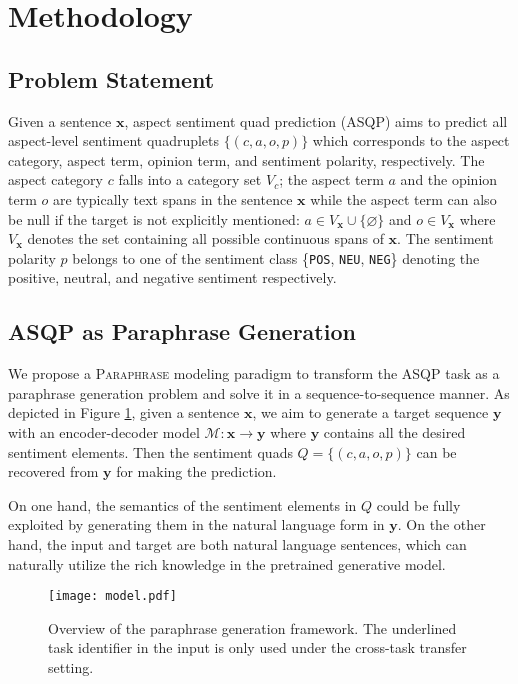 \documentclass[11pt]{article}
\begin{document}
\section{Methodology}

\subsection{Problem Statement}
Given a sentence $\boldsymbol{x}$, aspect sentiment quad prediction (ASQP) aims to predict all aspect-level sentiment quadruplets $\{(c, a, o, p)\}$ which corresponds to the aspect category, aspect term, opinion term, and sentiment polarity, respectively. The aspect category $c$ falls into a category set $V_c$; the aspect term $a$ and the opinion term $o$ are typically text spans in the sentence $\boldsymbol{x}$ while the aspect term can also be null if the target is not explicitly mentioned: $a \in V_{\boldsymbol{x}} \cup \{\varnothing\}$ and $o \in V_{\boldsymbol{x}}$ where $V_{\boldsymbol{x}}$ denotes the set containing all possible continuous spans of $\boldsymbol{x}$. The sentiment polarity $p$ belongs to one of the sentiment class \{\texttt{POS}, \texttt{NEU}, \texttt{NEG}\} denoting the positive, neutral, and negative sentiment respectively.


\subsection{ASQP as Paraphrase Generation} \label{sec:paraphrase}
We propose a \textsc{Paraphrase} modeling paradigm to transform the ASQP task as a paraphrase generation problem and solve it in a sequence-to-sequence manner. 
As depicted in Figure \ref{fig:model}, given a sentence $\boldsymbol{x}$, we aim to generate a target sequence $\boldsymbol{y}$ with an encoder-decoder model $\mathcal{M}: \boldsymbol{x} \rightarrow \boldsymbol{y}$ where $\boldsymbol{y}$ contains all the desired sentiment elements. Then the sentiment quads $Q=\{(c, a, o, p)\}$ can be recovered from $\boldsymbol{y}$ for making the prediction. 

On one hand, the semantics of the sentiment elements in $Q$ could be fully exploited by generating them in the natural language form in $\boldsymbol{y}$. On the other hand, the input and target are both natural language sentences, which can naturally utilize the rich knowledge in the pretrained generative model. 

\begin{figure}
    \centering
    \texttt{[image: model.pdf]}
    \caption{Overview of the paraphrase generation framework. The underlined task identifier in the input is only used under the cross-task transfer setting.}
    \label{fig:model}
    \vspace{-0.4cm}
\end{figure}
\end{document}
